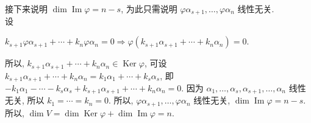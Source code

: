 \documentclass[14pt]{beamer}
\begin{document}
\begin{frame}{}
	接下来说明  $\operatorname{dim}\operatorname{Im} \varphi=n-s$, 为此只需说明  $\varphi \alpha_{s+1}, \ldots, \varphi \alpha_{n}$  线性无关.\\ 设 
	\begin{small}
		$k_{s+1} \varphi \alpha_{s+1}+\cdots+k_{n} \varphi \alpha_{n}=0 \Rightarrow \varphi \left(k_{s+1} \alpha_{s+1}+\cdots+k_{n} \alpha_{n}\right)=0.$
	\end{small} 
	所以, $k_{s+1} \alpha_{s+1}+\cdots+k_{n} \alpha_{n} \in \operatorname{Ker} \varphi$, 可设 $k_{s+1} \alpha_{s+1}+\cdots+k_{n} \alpha_{n}=k_{1} \alpha_{1}+\cdots+k_{s} \alpha_{s}$, 即  $-k_{1} \alpha_{1}-\cdots-k_{s} \alpha_{s}+k_{s+1} \alpha_{s+1}+\cdots+k_{n} \alpha_{n}=0$.
	因为 $\alpha_{1}, \ldots, \alpha_{s}, \alpha_{s+1}, \ldots, \alpha_{n}$  线性无关, 所以 $k_{1}=\cdots=k_{n}=0$. 所以, $\varphi \alpha_{s+1}, \ldots, \varphi \alpha_{n}$ 线性无关, $\operatorname{dim}\operatorname{Im} \varphi=n-s$. 所以, $\operatorname{dim} V=\operatorname{dim}\operatorname{Ker} \varphi + \operatorname{dim}\operatorname{Im} \varphi=n$.
\end{frame}





	






















	
\end{document}
